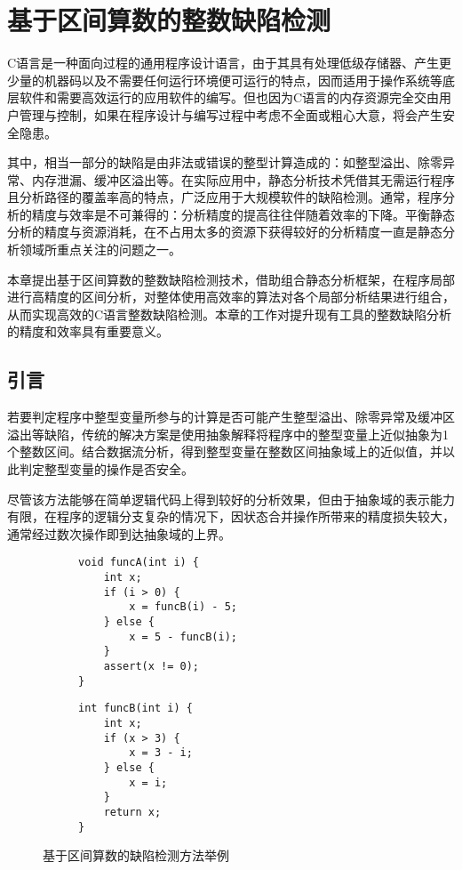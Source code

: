 
\chapter{基于区间算数的整数缺陷检测}

C语言是一种面向过程的通用程序设计语言，由于其具有处理低级存储器、产生更少量的机器码以及不需要任何运行环境便可运行的特点，因而适用于操作系统等底层软件和需要高效运行的应用软件的编写。但也因为C语言的内存资源完全交由用户管理与控制，如果在程序设计与编写过程中考虑不全面或粗心大意，将会产生安全隐患。

其中，相当一部分的缺陷是由非法或错误的整型计算造成的：如整型溢出、除零异常、内存泄漏、缓冲区溢出等。在实际应用中，静态分析技术凭借其无需运行程序且分析路径的覆盖率高的特点，广泛应用于大规模软件的缺陷检测。通常，程序分析的精度与效率是不可兼得的：分析精度的提高往往伴随着效率的下降。平衡静态分析的精度与资源消耗，在不占用太多的资源下获得较好的分析精度一直是静态分析领域所重点关注的问题之一。

本章提出基于区间算数的整数缺陷检测技术，借助组合静态分析框架，在程序局部进行高精度的区间分析，对整体使用高效率的算法对各个局部分析结果进行组合，从而实现高效的C语言整数缺陷检测。本章的工作对提升现有工具的整数缺陷分析的精度和效率具有重要意义。

\section{引言}

若要判定程序中整型变量所参与的计算是否可能产生整型溢出、除零异常及缓冲区溢出等缺陷，传统的解决方案是使用抽象解释将程序中的整型变量上近似抽象为1个整数区间。结合数据流分析，得到整型变量在整数区间抽象域上的近似值，并以此判定整型变量的操作是否安全。

尽管该方法能够在简单逻辑代码上得到较好的分析效果，但由于抽象域的表示能力有限，在程序的逻辑分支复杂的情况下，因状态合并操作所带来的精度损失较大，通常经过数次操作即到达抽象域的上界。

\begin{figure}[htb]
	\begin{subfigure}[b]{.5\linewidth}
			\begin{lstlisting}[xleftmargin=.15\textwidth]
void funcA(int i) {
	int x;
	if (i > 0) {
		x = funcB(i) - 5;
	} else {
		x = 5 - funcB(i);
	}
	assert(x != 0);
}
			\end{lstlisting}
	\end{subfigure}
	\begin{subfigure}[b]{.5\linewidth}
			\begin{lstlisting}[xleftmargin=.25\textwidth]
int funcB(int i) {
	int x;
	if (x > 3) {
		x = 3 - i;
	} else {
		x = i;
	}
	return x;
}
			\end{lstlisting}
\end{subfigure}
	\caption{基于区间算数的缺陷检测方法举例}
	\label{fig:codeExampleForSignRange}
\end{figure}{\tiny }

